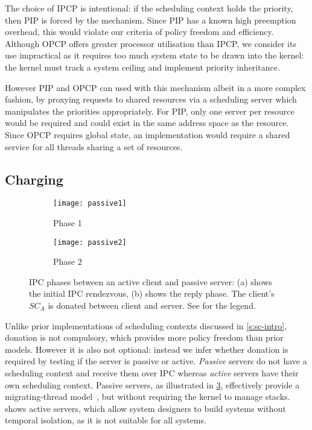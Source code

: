 The choice of \gls{IPCP} is intentional: if the scheduling context holds the priority, then \gls{PIP}
is forced by the mechanism. Since \gls{PIP} has a known high preemption overhead, this would violate
our criteria of policy freedom and efficiency.  
Although \gls{OPCP} offers greater processor utilisation than \gls{IPCP}, we consider its use impractical as it requires too much system state to be drawn into the kernel: the kernel must track a system ceiling and implement priority inheritance.

However \gls{PIP} and \gls{OPCP} can used with this mechanism albeit in a more complex fashion, by
proxying requests to shared resources via a scheduling server which manipulates the priorities
appropriately. For \gls{PIP}, only one server per resource would be required and could exist in the
same address space as the resource. Since \gls{OPCP} requires global state, an implementation would
require a shared service for all threads sharing a set of resources.

\subsection{Charging}

\begin{figure}
    \centering
    \begin{subfigure}[h]{0.48\textwidth}
        \centering
        \texttt{[image: passive1]}
        \caption{Phase 1}
        \label{f:ipc1}
    \end{subfigure}%
    \begin{subfigure}[h]{0.48\textwidth}
        \centering
        \texttt{[image: passive2]}
        \caption{Phase 2}
        \label{f:ipc2}
    \end{subfigure}
    \label{f:passive}
    \caption{IPC phases between an active client and passive server: (a) shows the initial IPC rendezvous, (b) shows the
    reply phase. The client's $SC_{A}$ is donated between client and server. See  for the legend.}
\end{figure}


Unlike prior implementations of scheduling contexts discussed in \cref{s:sc-intro},
donation is not compulsory, which provides more policy freedom than prior models.
However it is also not optional: instead we infer whether donation is required by testing 
if the server is passive or active. \emph{Passive} servers do not have a scheduling context 
and receive them over \gls{IPC} whereas \emph{active} servers have their own scheduling context. 
Passive servers, as illustrated in \cref{f:passive}, effectively provide a migrating-thread
model~\citep{Ford_Lepreau_94, Gabber_SBBS_99}, but without requiring
the kernel to manage stacks.  shows active servers, which allow system designers to
build systems without temporal isolation, as it is not suitable
for all systems.


